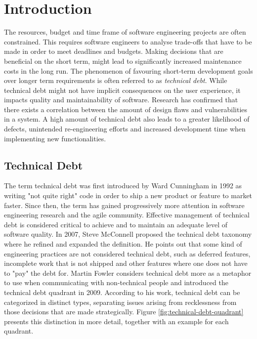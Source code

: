 \chapter{Introduction}


The resources, budget and time frame of software engineering projects are often constrained\cite{guo2011tracking}.
This requires software engineers to analyse trade-offs that have to be made in order to meet deadlines and budgets.
Making decisions that are beneficial on the short term, might lead to significantly increased maintenance costs in the long run.
The phenomenon of favouring short-term development goals over longer term requirements is often referred to as \emph{technical debt}.
While technical debt might not have implicit consequences on the user experience, it impacts quality and maintainability of software.
Research has confirmed that there exists a correlation between the amount of design flaws and vulnerabilities in a system\cite{nord2016debtvulnerabilities}.
A high amount of technical debt also leads to a greater likelihood of defects, unintended re-engineering efforts\cite{li2014empirical} and increased development time when implementing new functionalities.

\section{Technical Debt}
The term technical debt was first introduced by Ward Cunningham in 1992 as writing "not quite right" code in order to ship a new product or feature to market faster\cite{cunningham1993wycash}.
Since then, the term has gained progressively more attention in software engineering research and the agile community.
Effective management of technical debt is considered critical to achieve and to maintain an adequate level of software quality.
In 2007, Steve McConnell proposed the technical debt taxonomy where he refined and expanded the definition\cite{mcconnell2007debt}.
He points out that some kind of engineering practices are not considered technical debt, such as deferred features, incomplete work that is not shipped and other features where one does not have to "pay" the debt for.
Martin Fowler considers technical debt more as a metaphor to use when communicating with non-technical people and introduced the technical debt quadrant in 2009\cite{technicaldebtquadrant}.
According to his work, technical debt can be categorized in distinct types, separating issues arising from recklessness from those decisions that are made strategically. 
Figure \ref{fig:technical-debt-quadrant} presents this distinction in more detail, together with an example for each quadrant.\\

